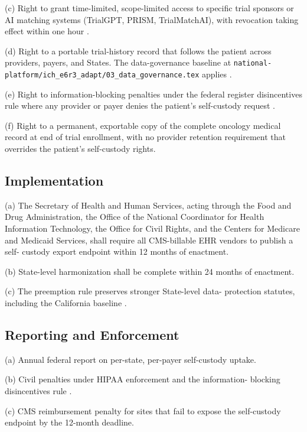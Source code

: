 (c) Right to grant time-limited, scope-limited access to specific
trial sponsors or AI matching systems (TrialGPT, PRISM,
TrialMatchAI), with revocation taking effect within one hour
\cite{jin2024trialgpt, gupta2024prism, abdallah2026trialmatchai}.

(d) Right to a portable trial-history record that follows the
patient across providers, payers, and States. The data-governance
baseline at
\texttt{national-platform/ich\_e6r3\_adapt/03\_data\_governance.tex}
applies \cite{kawchak_2026_18973368}.

(e) Right to information-blocking penalties under the federal
register disincentives rule where any provider or payer denies the
patient's self-custody request
\cite{federal_register_info_blocking_disincentives_2024}.

(f) Right to a permanent, exportable copy of the complete oncology
medical record at end of trial enrollment, with no provider
retention requirement that overrides the patient's self-custody
rights.

\subsection{Implementation}

(a) The Secretary of Health and Human Services, acting through the
Food and Drug Administration, the Office of the National
Coordinator for Health Information Technology, the Office for
Civil Rights, and the Centers for Medicare and Medicaid Services,
shall require all CMS-billable EHR vendors to publish a self-
custody export endpoint within 12 months of enactment.

(b) State-level harmonization shall be complete within 24 months
of enactment.

(c) The preemption rule preserves stronger State-level data-
protection statutes, including the California baseline
\cite{kawchak_2026_19176370}.

\subsection{Reporting and Enforcement}

(a) Annual federal report on per-state, per-payer self-custody
uptake.

(b) Civil penalties under HIPAA enforcement and the information-
blocking disincentives rule
\cite{federal_register_info_blocking_disincentives_2024}.

(c) CMS reimbursement penalty for sites that fail to expose the
self-custody endpoint by the 12-month deadline.


